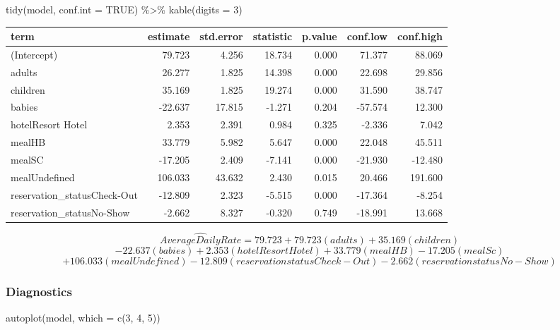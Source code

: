 \documentclass[
]{article}
\newenvironment{Shaded}{\begin{snugshade}}{\end{snugshade}}
\newcommand{\AttributeTok}[1]{\textcolor[rgb]{0.77,0.63,0.00}{#1}}
\newcommand{\ConstantTok}[1]{\textcolor[rgb]{0.00,0.00,0.00}{#1}}
\newcommand{\DecValTok}[1]{\textcolor[rgb]{0.00,0.00,0.81}{#1}}
\newcommand{\FunctionTok}[1]{\textcolor[rgb]{0.00,0.00,0.00}{#1}}
\newcommand{\NormalTok}[1]{#1}
\newcommand{\SpecialCharTok}[1]{\textcolor[rgb]{0.00,0.00,0.00}{#1}}
\begin{document}
\begin{Shaded}
\begin{Highlighting}[]
\FunctionTok{tidy}\NormalTok{(model, }\AttributeTok{conf.int =} \ConstantTok{TRUE}\NormalTok{) }\SpecialCharTok{\%\textgreater{}\%}
\FunctionTok{kable}\NormalTok{(}\AttributeTok{digits =} \DecValTok{3}\NormalTok{)}
\end{Highlighting}
\end{Shaded}

\begin{longtable}[]{@{}lrrrrrr@{}}
\toprule
term & estimate & std.error & statistic & p.value & conf.low &
conf.high \\
\midrule
\endhead
(Intercept) & 79.723 & 4.256 & 18.734 & 0.000 & 71.377 & 88.069 \\
adults & 26.277 & 1.825 & 14.398 & 0.000 & 22.698 & 29.856 \\
children & 35.169 & 1.825 & 19.274 & 0.000 & 31.590 & 38.747 \\
babies & -22.637 & 17.815 & -1.271 & 0.204 & -57.574 & 12.300 \\
hotelResort Hotel & 2.353 & 2.391 & 0.984 & 0.325 & -2.336 & 7.042 \\
mealHB & 33.779 & 5.982 & 5.647 & 0.000 & 22.048 & 45.511 \\
mealSC & -17.205 & 2.409 & -7.141 & 0.000 & -21.930 & -12.480 \\
mealUndefined & 106.033 & 43.632 & 2.430 & 0.015 & 20.466 & 191.600 \\
reservation\_statusCheck-Out & -12.809 & 2.323 & -5.515 & 0.000 &
-17.364 & -8.254 \\
reservation\_statusNo-Show & -2.662 & 8.327 & -0.320 & 0.749 & -18.991 &
13.668 \\
\bottomrule
\end{longtable}

\[\hat{Average Daily Rate} = 79.723  + 79.723   (adults) + 35.169(children)\]
\[ -22.637(babies) + 2.353(hotel Resort Hotel) + 33.779 (mealHB) - 17.205(mealSc)\]
\[+106.033(mealUndefined)-12.809(reservationstatusCheck-Out) - 2.662(reservationstatusNo-Show)\]

\hypertarget{diagnostics}{%
\subsubsection{Diagnostics}\label{diagnostics}}

\begin{Shaded}
\begin{Highlighting}[]
\FunctionTok{autoplot}\NormalTok{(model, }\AttributeTok{which =} \FunctionTok{c}\NormalTok{(}\DecValTok{3}\NormalTok{, }\DecValTok{4}\NormalTok{, }\DecValTok{5}\NormalTok{))}
\end{Highlighting}
\end{Shaded}
\end{document}
